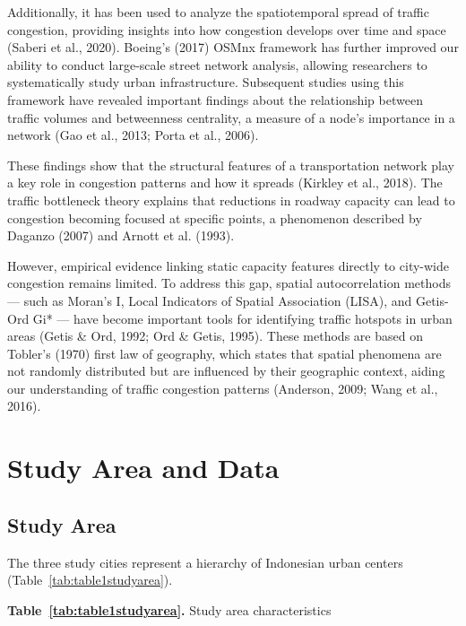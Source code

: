 \documentclass[12pt,a4paper]{article}
\begin{document}
Additionally, it has been used to analyze the spatiotemporal spread of traffic congestion, providing insights into how congestion develops over time and space (Saberi et al., 2020). Boeing’s (2017) OSMnx framework has further improved our ability to conduct large-scale street network analysis, allowing researchers to systematically study urban infrastructure. Subsequent studies using this framework have revealed important findings about the relationship between traffic volumes and betweenness centrality, a measure of a node’s importance in a network (Gao et al., 2013; Porta et al., 2006).

These findings show that the structural features of a transportation network play a key role in congestion patterns and how it spreads (Kirkley et al., 2018). The traffic bottleneck theory explains that reductions in roadway capacity can lead to congestion becoming focused at specific points, a phenomenon described by Daganzo (2007) and Arnott et al. (1993).

However, empirical evidence linking static capacity features directly to city-wide congestion remains limited. To address this gap, spatial autocorrelation methods — such as Moran’s I, Local Indicators of Spatial Association (LISA), and Getis-Ord Gi* — have become important tools for identifying traffic hotspots in urban areas (Getis \& Ord, 1992; Ord \& Getis, 1995). These methods are based on Tobler’s (1970) first law of geography, which states that spatial phenomena are not randomly distributed but are influenced by their geographic context, aiding our understanding of traffic congestion patterns (Anderson, 2009; Wang et al., 2016).


\section{Study Area and Data}

\subsection{Study Area}

The three study cities represent a hierarchy of Indonesian urban centers (Table~\ref{tab:table1studyarea}).

\textbf{Table~\ref{tab:table1studyarea}.} Study area characteristics
\end{document}
